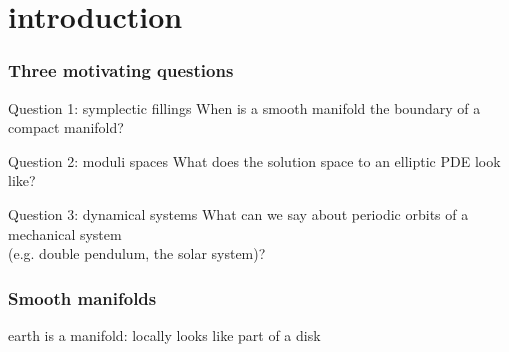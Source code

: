 
\section{introduction}
\begin{frame}
  \frametitle{Three motivating questions}
  \begin{block}{Question 1: symplectic fillings}
    When is a smooth manifold the boundary of a compact manifold?
  \end{block}
  \begin{block}{Question 2: moduli spaces}
    What does the solution space to an elliptic PDE look like?
  \end{block}
  \begin{block}{Question 3: dynamical systems}
    What can we say about periodic orbits of a mechanical system\\(e.g. double pendulum, the solar system)?
  \end{block}
\end{frame}

\begin{frame}
  \frametitle{Smooth manifolds}
  \makebox[\textwidth]{\framebox[5cm]{
    \rule{0pt}{5cm}
  }}
  earth is a manifold: locally looks like part of a disk
\end{frame}

